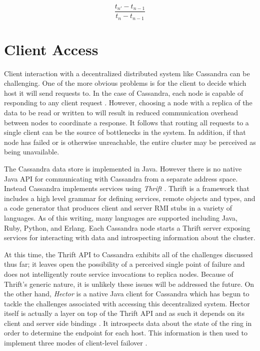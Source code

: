 \documentclass[twocolumn]{article}
\begin{document}
\begin{equation}\label{eq:xferfraction}
\frac{t_{n\prime} - t_{n-1}}{t_n - t_{n-1}}
\end{equation}

\section{Client Access}\label{s:api}

Client interaction with a decentralized distributed system like Cassandra can be challenging.  One of the more obvious problems is for the client to decide which host it will send requests to.  In the case of Cassandra, each node is capable of responding to any client request \cite{ref:cwiki}.  However, choosing a node with a replica of the data to be read or written to will result in reduced communication overhead between nodes to coordinate a response.  It follows that routing all requests to a single client can be the source of bottlenecks in the system. In addition, if that node has failed or is otherwise unreachable, the entire cluster may be perceived as being unavailable.

The Cassandra data store is implemented in Java.  However there is no native Java API for communicating with Cassandra from a separate address space.  Instead Cassandra implements services using \emph{Thrift} \cite{ref:thrift,ref:cwiki}.  Thrift is a framework that includes a high level grammar for defining services, remote objects and types, and a code generator that produces client and server RMI stubs in a variety of languages.  As of this writing, many languages are supported including Java, Ruby, Python, and Erlang.  Each Cassandra node starts a Thrift server exposing services for interacting with data and introspecting information about the cluster.

At this time, the Thrift API to Cassandra exhibits all of the challenges discussed thus far; it leaves open the possibility of a perceived single point of failure and does not intelligently route service invocations to replica nodes.  Because of Thrift's generic nature, it is unlikely these issues will be addressed the future.  On the other hand, \emph{Hector} is a native Java client for Cassandra which has begun to tackle the challenges associated with accessing this decentralized system.  Hector itself is actually a layer on top of the Thrift API and as such it depends on its client and server side bindings \cite{ref:hectorsource}.  It introspects data about the state of the ring in order to determine the endpoint for each host.  This information is then used to implement three modes of client-level failover \cite{ref:hectorsource}.
\end{document}
